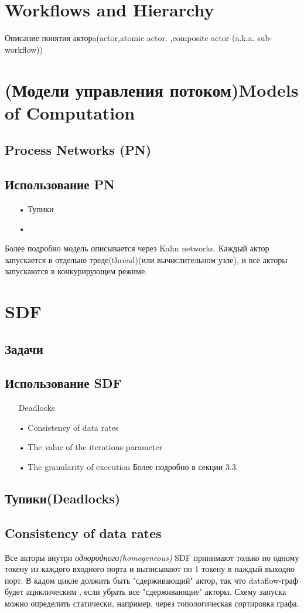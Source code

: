 \documentclass[a4paper,14pt]{article}
\begin{document}
\section{Workflows and Hierarchy}
Описание понятия  	акторa(actor,atomic actor.
,composite actor (a.k.a. sub-workflow))
\section{(Модели управления потоком)Models of Computation}
\subsection*{Process Networks (PN)}
\subsection{Использование PN}
\begin{enumerate}
\item[•] Тупики
\item[•] 
\end{enumerate}
Более подробно модель описывается  через Kahn networks.
Каждый актор запускается в отдельно треде(thread)(или вычислительном узле), и все акторы запускаются в конкурирующем режиме. 


\section*{SDF}
\subsection{Задачи}
\subsection{Использование SDF}
\begin{enumerate}
\item[] Deadlocks
\item[•] Consistency of data rates
\item[•] The value of the iterations parameter
\item[•] The granularity of execution
 Более подробно в секции 3.3.
\end{enumerate}
\subsection{Тупики(Deadlocks)}
\subsection{Consistency of data rates}
Все акторы внутри \textit{однородного(homogeneous)} SDF принимают только по одному токену из каждого входного порта и выписывают по 1 токену в наждый выходно порт. В кадом цикле должить быть "сдерживающий" актор,  так что dataflow-граф будет ациклическим , если убрать все "сдерживающие" акторы. Схему запуска можно определить статически, например, через топологическая сортировка графа.
\end{document}
